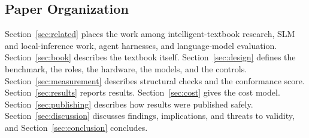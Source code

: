 \subsection{Paper Organization}

Section~\ref{sec:related} places the work among intelligent-textbook research, SLM and local-inference work, agent harnesses, and language-model evaluation. Section~\ref{sec:book} describes the textbook itself. Section~\ref{sec:design} defines the benchmark, the roles, the hardware, the models, and the controls. Section~\ref{sec:measurement} describes structural checks and the conformance score. Section~\ref{sec:results} reports results. Section~\ref{sec:cost} gives the cost model. Section~\ref{sec:publishing} describes how results were published safely. Section~\ref{sec:discussion} discusses findings, implications, and threats to validity, and Section~\ref{sec:conclusion} concludes.

